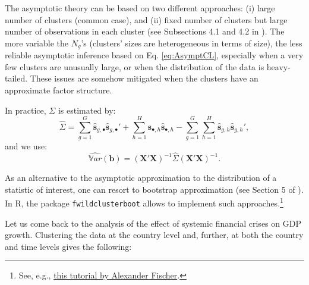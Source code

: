 \documentclass[
  12pt,
]{book}
\theoremstyle{definition}
\theoremstyle{definition}
\theoremstyle{definition}
\theoremstyle{definition}
\theoremstyle{remark}
\begin{document}
The asymptotic theory can be based on two different approaches: (i) large number of clusters (common case), and (ii) fixed number of clusters but large number of observations in each cluster (see Subsections 4.1 and 4.2 in \citet{MACKINNON2022}). The more variable the \(N_g\)'s (clusters' sizes are heterogeneous in terms of size), the less reliable asymptotic inference based on Eq. \eqref{eq:AsymptCL}, especially when a very few clusters are unusually large, or when the distribution of the data is heavy-tailed. These issues are somehow mitigated when the clusters have an approximate factor structure.

In practice, \(\Sigma\) is estimated by:
\[
\widehat{\Sigma} = \sum_{g=1}^G \widehat{\mathbf{s}}_{g,\bullet}\widehat{\mathbf{s}}_{g,\bullet}' + \sum_{h=1}^H \widehat{\mathbf{s}}_{\bullet,h}\widehat{\mathbf{s}}_{\bullet,h} - \sum_{g=1}^G\sum_{h=1}^H \widehat{\mathbf{s}}_{g,h}\widehat{\mathbf{s}}_{g,h}',
\]
and we use:
\[
\widehat{\mathbb{V}ar}(\mathbf{b}) = \left(\mathbf{X}'\mathbf{X}\right)^{-1}\widehat{\Sigma}\left(\mathbf{X}'\mathbf{X}\right)^{-1}.
\]

As an alternative to the asymptotic approximation to the distribution of a statistic of interest, one can resort to bootstrap approximation (see Section 5 of \citet{MACKINNON2022}). In R, the package \texttt{fwildclusterboot} allows to implement such approaches.\footnote{See, e.g., \href{https://cran.r-project.org/web/packages/fwildclusterboot/vignettes/fwildclusterboot.html}{this tutorial by Alexander Fischer}.}

Let us come back to the analysis of the effect of systemic financial crises on GDP growth. Clustering the data at the country level and, further, at both the country and time levels gives the following:
\end{document}
